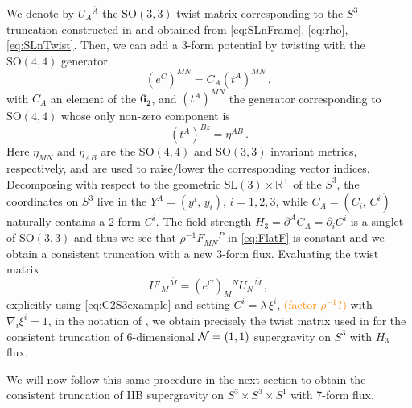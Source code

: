 \documentclass[a4paper, 11pt]{article}
\numberwithin{equation}{section}
\newcommand{\ov}[1]{\overline{#1}}
\newcommand{\SL}[1]{\mathrm{SL}( #1 )}
\newcommand{\SO}[1]{\mathrm{SO}( #1 )}
\newcommand{\+}{\oplus}
\newcommand{\EM}[1]{\textcolor{red}{#1}}
\newcommand{\CE}[1]{\textcolor{darkorange}{#1}}
\begin{document}
We denote by $U_A{}^{\ov{A}}$ the $\SO{3,3}$ twist matrix corresponding to the $S^3$ truncation constructed in \cite{Lee:2014mla,Baguet:2015iou} and obtained from \eqref{eq:SLnFrame}, \eqref{eq:rho}, \eqref{eq:SLnTwist}. Then, we can add a 3-form potential by twisting with the $\SO{4,4}$ generator
\begin{equation} \label{eq:C2S3example}
	(e^C)^{MN} = C_A \left( t^A \right)^{MN} \,,
\end{equation}
with $C_A$ an element of the $\mathbf{6_{2}}$, and $\left( t^A \right)^{MN}$ the generator corresponding to $\SO{4,4}$ whose only non-zero component is
\begin{equation}
	\left(t^A\right)^{Bz} = \eta^{AB} \,.
\end{equation}
Here $\eta_{MN}$ and $\eta_{AB}$ are the $\SO{4,4}$ and $\SO{3,3}$ invariant metrics, respectively, and are used to raise/lower the corresponding vector indices. Decomposing with respect to the geometric $\SL{3} \times \mathbb{R}^+$ of the $S^3$,  the coordinates on $S^3$ live in the $Y^A = \left( y^i,\, y_i \right)$, $i = 1, 2, 3$, while $C_A = \left( C_i,\, C^i \right)$ naturally contains a 2-form $C^i$. The field strength $H_3 = \partial^A C_A = \partial_i C^i$ is a singlet of $\SO{3,3}$ and thus we see that $\rho^{-1} F_{\ov{M}\ov{N}}{}^{\ov{P}}$ in \eqref{eq:FlatF} is constant and we obtain a consistent truncation with a new 3-form flux. Evaluating the twist matrix
\begin{equation}
	U'_M{}^{\ov{M}} = (e^C)_M{}^N  U_N{}^{\ov{M}} \,,
\end{equation}
explicitly using \eqref{eq:C2S3example} and setting $C^i = \lambda\, \xi^i$, \CE{(factor $\rho^{-1}$?)} with $\nabla_i \xi^i = 1$, in the notation of \cite{Eloy:2021fhc}, we obtain precisely the twist matrix used in \cite{Eloy:2021fhc} for the consistent truncation of 6-dimensional ${\cal N}=(1,1)$ supergravity on $S^3$ with $H_3$ flux. %

We will now follow this same procedure in the next section to obtain the consistent truncation of IIB supergravity on $S^3 \times S^3 \times S^1$ with 7-form flux.
\end{document}
